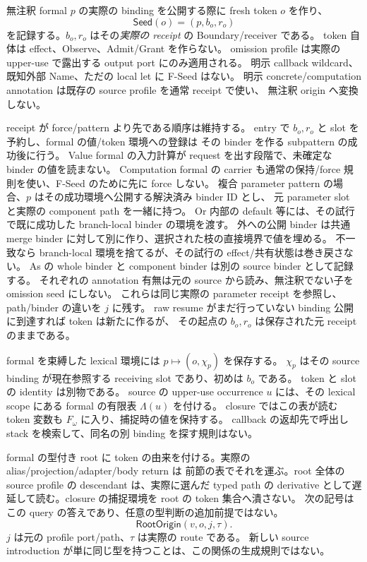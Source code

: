 \documentclass[11pt,a4paper]{article}
\begin{document}
無注釈 formal \(p\) の実際の binding を公開する際に fresh token \(o\) を作り、
\[
  \mathsf{Seed}(o)=(p,b_o,r_o)
  \tag{F-Seed}
\]
を記録する。\(b_o,r_o\) はその\emph{実際の receipt} の Boundary/receiver である。
token 自体は effect、Observe、Admit/Grant を作らない。
omission profile は実際の upper-use で露出する output port にのみ適用される。
明示 callback wildcard、既知外部 Name、ただの local let に F-Seed はない。
明示 concrete/computation annotation は既存の source profile を通常 receipt で使い、
無注釈 origin へ変換しない。

receipt が force/pattern より先である順序は維持する。
entry で \(b_o,r_o\) と slot を予約し、formal の値/token 環境への登録は
その binder を作る subpattern の成功後に行う。
Value formal の入力計算が request を出す段階で、未確定な binder の値を読まない。
Computation formal の carrier も通常の保持/force 規則を使い、F-Seed のために先に force しない。
複合 parameter pattern の場合、\(p\) はその成功環境へ公開する解決済み binder ID とし、
元 parameter slot と実際の component path を一緒に持つ。
Or 内部の default 等には、その試行で既に成功した branch-local binder の環境を渡す。
外への公開 binder は共通 merge binder に対して別に作り、選択された枝の直接境界で値を埋める。
不一致なら branch-local 環境を捨てるが、その試行の effect/共有状態は巻き戻さない。
As の whole binder と component binder は別の source binder として記録する。
それぞれの annotation 有無は元の source から読み、無注釈でない子を omission seed にしない。
これらは同じ実際の parameter receipt を参照し、path/binder の違いを \(j\) に残す。
raw resume がまだ行っていない binding 公開に到達すれば token は新たに作るが、
その起点の \(b_o,r_o\) は保存された元 receipt のままである。

formal を束縛した lexical 環境には \(p\mapsto(o,\chi_p)\) を保存する。
\(\chi_p\) はその source binding が現在参照する receiving slot であり、初めは \(b_o\) である。
token と slot の identity は別物である。
source の upper-use occurrence \(u\) には、その lexical scope にある formal の有限表
\(\Lambda(u)\) を付ける。
closure ではこの表が読む token 変数も \(F_\omega\) に入り、捕捉時の値を保持する。
callback の返却先で呼出し stack を検索して、同名の別 binding を探す規則はない。

formal の型付き root に token の由来を付ける。実際の alias/projection/adapter/body return は
前節の表でそれを運ぶ。root 全体の source profile の descendant は、実際に選んだ typed path の
derivative として遅延して読む。closure の捕捉環境を root の token 集合へ潰さない。
次の記号はこの query の答えであり、任意の型判断の追加前提ではない。
\[
 \mathsf{RootOrigin}(v,o,j,\tau).
 \tag{F-Root}
\]
\(j\) は元の profile port/path、\(\tau\) は実際の route である。
新しい source introduction が単に同じ型を持つことは、この関係の生成規則ではない。
\end{document}
